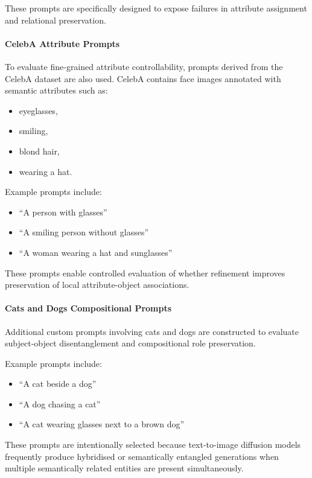 \documentclass[a4paper,twoside,12pt]{report}
\begin{document}
These prompts are specifically designed to expose failures in attribute assignment and relational preservation.

\paragraph{CelebA Attribute Prompts}

To evaluate fine-grained attribute controllability, prompts derived from the CelebA dataset are also used. CelebA contains face images annotated with semantic attributes such as:

\begin{itemize}
    \item eyeglasses,
    \item smiling,
    \item blond hair,
    \item wearing a hat.
\end{itemize}

Example prompts include:

\begin{itemize}
    \item ``A person with glasses''
    \item ``A smiling person without glasses''
    \item ``A woman wearing a hat and sunglasses''
\end{itemize}

These prompts enable controlled evaluation of whether refinement improves preservation of local attribute-object associations.

\paragraph{Cats and Dogs Compositional Prompts}

Additional custom prompts involving cats and dogs are constructed to evaluate subject-object disentanglement and compositional role preservation.

Example prompts include:

\begin{itemize}
    \item ``A cat beside a dog''
    \item ``A dog chasing a cat''
    \item ``A cat wearing glasses next to a brown dog''
\end{itemize}

These prompts are intentionally selected because text-to-image diffusion models frequently produce hybridised or semantically entangled generations when multiple semantically related entities are present simultaneously.
\end{document}
